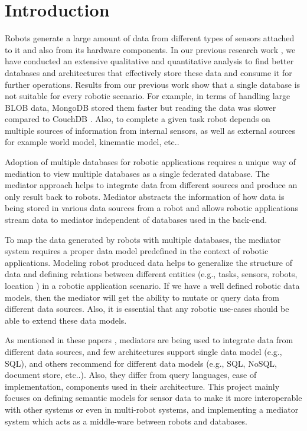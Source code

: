 

    \chapter{Introduction}

Robots generate a large amount of data from different types of sensors attached to it and also from its hardware components. In our previous research work \cite{ravichandranworkbench}, we have conducted an extensive qualitative and quantitative analysis to find better databases and architectures that effectively store these data and consume it for further operations. Results from our previous work show that a single database is not suitable for every robotic scenario. For example, in terms of handling large BLOB data, MongoDB stored them faster but reading the data was slower compared to CouchDB \cite{ravichandranworkbench}. Also, to complete a given task robot depends on multiple sources of information from internal sensors, as well as external sources for example world model, kinematic model, etc.. 

Adoption of multiple databases for robotic applications requires a unique way of mediation to view multiple databases as a single federated database. The mediator approach helps to integrate data from different sources and produce an only result back to robots. Mediator abstracts the information of how data is being stored in various data sources from a robot and allows robotic applications stream data to mediator independent of databases used in the back-end.

To map the data generated by robots with multiple databases, the mediator system requires a proper data model predefined in the context of robotic applications. Modeling robot produced data helps to generalize the structure of data and defining relations between different entities (e.g., tasks,  sensors, robots, location ) in a robotic application scenario. If we have a well defined robotic data models, then the mediator will get the ability to mutate or query data from different data sources. Also, it is essential that any robotic use-cases should be able to extend these data models.


As mentioned in these papers \cite{ahmed1991pegasus,fahl1993amos,arens1996query,chawathe1994tsimmis,chawathe1994tsimmis,shoens1993rufus}, mediators are being used to integrate data from different data sources, and few architectures support single data model (e.g., SQL), and others recommend for different data models (e.g., SQL, NoSQL, document store, etc..). Also, they differ from query languages, ease of implementation, components used in their architecture. This project mainly focuses on defining semantic models for sensor data to make it more interoperable with other systems or even in multi-robot systems, and implementing a mediator system which acts as a middle-ware between robots and databases. 

